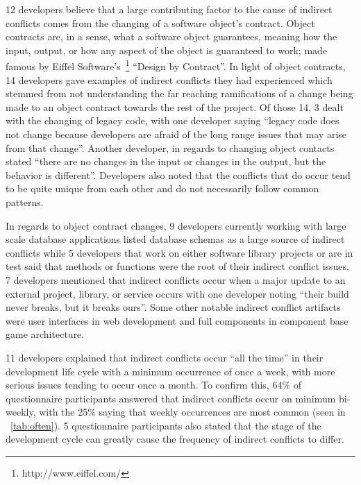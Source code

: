 \documentclass[conference]{IEEEtran}
\begin{document}
12 developers believe that a large contributing factor to the cause
of indirect conflicts comes from the changing of a software object's contract. Object contracts are, in a sense,
what a software object guarantees, meaning how the input, output, or how any aspect of the object is guaranteed
to work; made famous by Eiffel Software's~\footnote{http://www.eiffel.com/} ``Design by Contract''\texttrademark.
In light of object contracts, 14 developers gave examples of indirect conflicts they had experienced
which stemmed from not understanding the far reaching ramifications of a change being made to an object contract
towards the rest of the project. Of those 14, 3 dealt
with the changing of legacy code, with one developer saying ``legacy code does not change because developers
are afraid of the long range issues that may arise from that change''. Another developer, in regards to changing
object contacts stated ``there are no changes in the input or changes in the output, but the behavior is different''.
Developers also noted that the conflicts that do occur tend to be quite unique from each other and do not necessarily
follow common patterns.

In regards to object contract changes, 9 developers currently working with large scale database applications listed database
schemas as a large source of indirect conflicts while 5 developers that work on either software
library projects or are in test said that methods or functions were the root of their indirect conflict issues.
7 developers mentioned that indirect conflicts occur when a major update to an external project,
library, or service occurs with one developer noting ``their build never breaks, but it breaks ours''. Some
other notable indirect conflict artifacts were user interfaces in web development and full components in component
base game architecture.

11 developers explained that indirect conflicts occur ``all the time'' in
their development life cycle with a minimum occurrence of once a week, with more serious issues tending
to occur once a month. To confirm this, 64\% of questionnaire participants answered that indirect conflicts occur on minimum bi-weekly,
with the 25\% saying that weekly occurrences are most common (seen in ~\ref{tab:often}). 5 questionnaire participants
also stated that the stage of the development cycle can greatly cause the frequency of indirect conflicts to
differ.
\end{document}
